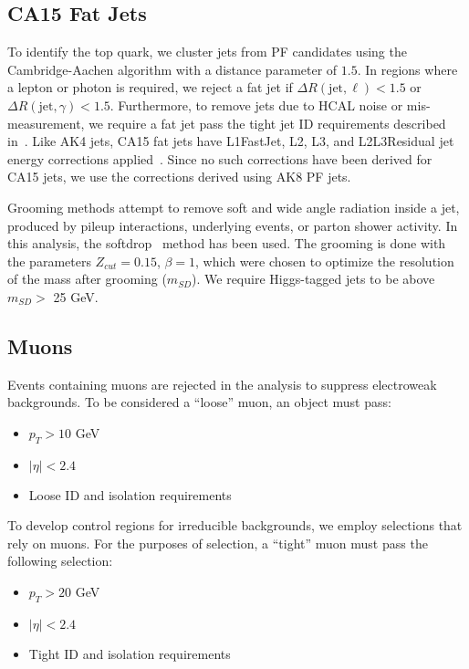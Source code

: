 \subsection{CA15 Fat Jets}\label{sec:fatjets}
To identify the top quark, we cluster jets from PF candidates using the Cambridge-Aachen algorithm with a distance parameter of $1.5$. 
In regions where a lepton or photon is required, we reject a fat jet if $\Delta R(\text{jet},\ell)<1.5$ or $\Delta R(\text{jet},\gamma)<1.5$.
Furthermore, to remove jets due to HCAL noise or mis-measurement, we require a fat jet pass the tight jet ID requirements described in~\cite{CMS_AN_2016-473}.
Like AK4 jets, CA15 fat jets have L1FastJet, L2, L3, and L2L3Residual jet energy corrections applied~\cite{JEC_TWIKI}. 
Since no such corrections have been derived for CA15 jets, we use the corrections derived using AK8 PF jets.

Grooming methods attempt to remove soft and wide angle radiation inside a jet, produced by pileup interactions, underlying events, or parton shower activity. In this analysis, the softdrop~\cite{msd} method has been used. The grooming is done with the parameters $Z_{cut} = 0.15$,  $\beta = 1$, which were chosen to optimize the resolution of the mass after grooming ($m_{SD}$). We require Higgs-tagged jets to be above $m_{SD} >$ 25 GeV.



\subsection{Muons}
\label{subsec:muons}

Events containing muons are rejected in the analysis to suppress electroweak backgrounds. 
To be considered a ``loose'' muon, an object must pass:
\begin{itemize}
  \item $p_T>10$ GeV
  \item $|\eta|<2.4$
  \item Loose ID and isolation requirements \cite{CMS-MUO-TWIKI-IDLOOSE}
\end{itemize}

To develop control regions for irreducible backgrounds, we employ selections that rely on muons.
For the purposes of selection, a ``tight'' muon must pass the following selection:
\begin{itemize}
  \item $p_T>20$ GeV
  \item $|\eta|<2.4$
  \item Tight ID and isolation requirements \cite{CMS-MUO-TWIKI-IDTIGHT}
\end{itemize}

